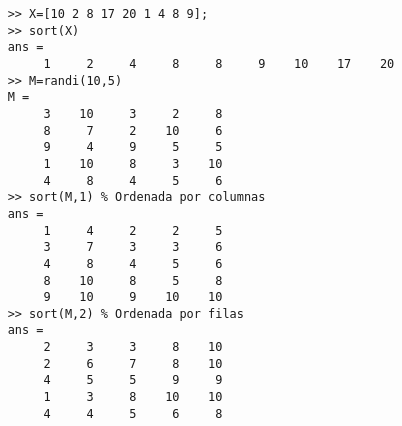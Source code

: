\begin{verbatim}
	>> X=[10 2 8 17 20 1 4 8 9];
	>> sort(X)
	ans =
	     1     2     4     8     8     9    10    17    20
	>> M=randi(10,5)
	M =
	     3    10     3     2     8
	     8     7     2    10     6
	     9     4     9     5     5
	     1    10     8     3    10
	     4     8     4     5     6
	>> sort(M,1) % Ordenada por columnas
	ans =
	     1     4     2     2     5
	     3     7     3     3     6
	     4     8     4     5     6
	     8    10     8     5     8
	     9    10     9    10    10
	>> sort(M,2) % Ordenada por filas
	ans =
	     2     3     3     8    10
	     2     6     7     8    10
	     4     5     5     9     9
	     1     3     8    10    10
	     4     4     5     6     8
\end{verbatim}